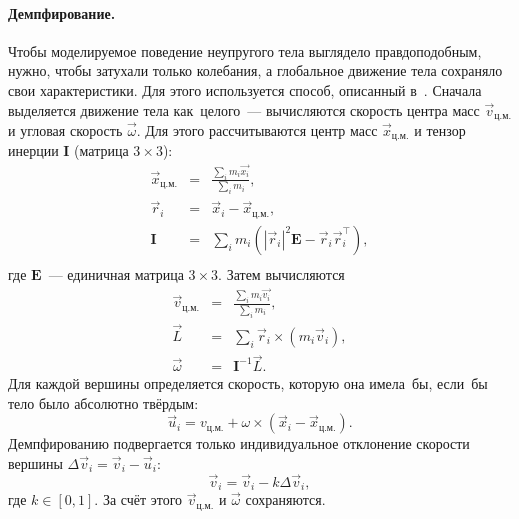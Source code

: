 \documentclass[a4paper, 14pt, titlepage]{extarticle}
\newcommand{\vect}[1]{\vec{#1}} %
\newcommand{\matx}[1]{\mathbf{#1}} %
\newcommand{\transposed}{\top} %
\begin{document}
        \paragraph{Демпфирование.} Чтобы моделируемое поведение неупругого тела выглядело правдоподобным,
        нужно, чтобы затухали только колебания, а глобальное движение тела сохраняло свои характеристики.
        Для этого используется способ, описанный в~\cite[с.~5]{mueller-position-dynamics}. Сначала выделяется
        движение тела как~целого~--- вычисляются скорость центра масс $\vect{v}_{ц.м.}$ и угловая
        скорость $\vect{\omega}$. Для этого рассчитываются центр масс
        $\vect{x}_{ц.м.}$ и тензор инерции $\matx I$ (матрица $3 \times 3$):
        \begin{eqnarray*}
          \vect{x}_{ц.м.} & = & \frac{\sum_i m_i \vect{x_i}}{\sum_i m_i},\\
          \vect{r}_i      & = & \vect{x}_i - \vect{x}_{ц.м.},\\
          \matx{I}        & = & \sum_i m_i ( |\vect{r}_i|^2 \matx E - \vect{r}_i \vect{r}_i^\transposed),\\
        \end{eqnarray*}
        где $\matx E$~--- единичная матрица $3 \times 3$. Затем вычисляются
        \begin{eqnarray*}
          \vect{v}_{ц.м.} & = & \frac{\sum_i m_i \vect{v_i}}{\sum_i m_i},\\
          \vect{L}        & = & \sum_i \vect{r}_i \times (m_i \vect{v}_i),\\
          \vect{\omega}   & = & \matx{I}^{-1} \vect{L}.
        \end{eqnarray*}
        Для каждой вершины определяется скорость,
        которую она имела~бы, если~бы тело было абсолютно твёрдым:
        \begin{equation}\label{eq:rigid_velocity}
          \vect{u}_i = v_{ц.м.} + \omega \times (\vect{x}_i - \vect{x}_{ц.м.}).
        \end{equation}
        Демпфированию подвергается только индивидуальное отклонение скорости вершины
        $\Delta \vect{v}_i = \vect{v}_i - \vect{u}_i$:
        \begin{equation}\label{eq:damping}
          \vect{v}_i = \vect{v}_i - k \Delta \vect{v}_i,
        \end{equation}
        где $k \in [0, 1]$. За счёт этого $\vect{v}_{ц.м.}$ и $\vect{\omega}$ сохраняются.
\end{document}
